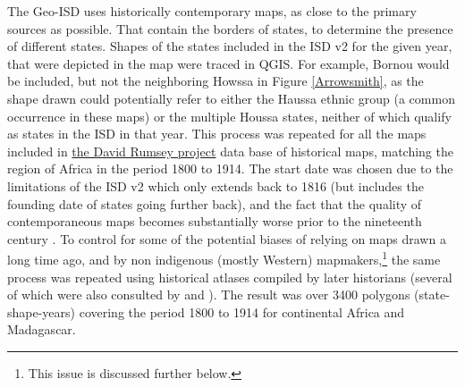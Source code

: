 \documentclass[12pt]{article}
\begin{document}
The Geo-ISD uses historically contemporary maps, as close to the primary sources
as possible. That contain the borders of states, to determine the presence of
different states. 
Shapes of the states included in the ISD v2 for the given year, that were
depicted in the map were traced in QGIS. For example, Bornou would be included,
but not the neighboring Howssa in Figure \ref{Arrowsmith}, as the shape drawn
could potentially refer to either the Haussa ethnic group (a common occurrence
in these maps) or the multiple Houssa states, neither of which qualify as states
in the ISD in that year. This process was repeated for all the maps included in
\href{https://www.davidrumsey.com}{the David Rumsey project} data base of
historical maps, matching the region of Africa in the period 1800 to 1914. The
start date was chosen due to the limitations of the ISD v2 which only extends
back to 1816 (but includes the founding date of states going further back), and
the fact that the quality of contemporaneous maps becomes substantially worse
prior to the nineteenth century \citep{Bassett_1994}. To control for some of the
potential biases of relying on maps drawn a long time ago, and by non indigenous
(mostly Western) mapmakers,\footnote{This issue is discussed further below.} the
same process was repeated using historical atlases compiled by later historians
(several of which were also consulted by \citet{Depetris-Chauvin2016} and
\citet{Paine2019}). The result was over 3400 polygons (state-shape-years)
covering the period 1800 to 1914 for continental Africa and Madagascar. 
\end{document}
